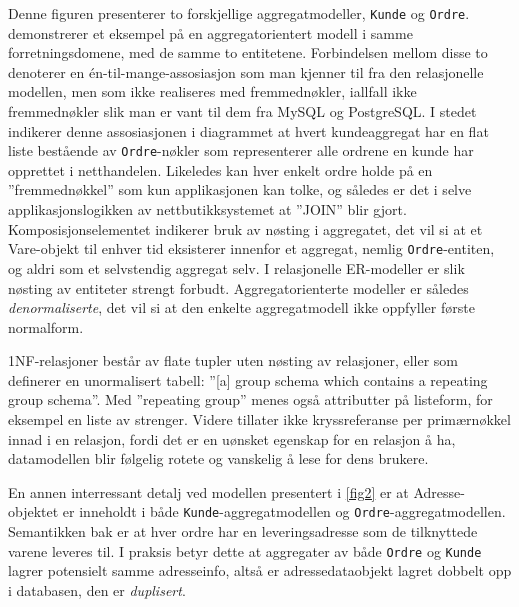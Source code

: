 Denne figuren presenterer to forskjellige aggregatmodeller, \texttt{Kunde} og \texttt{Ordre}. \cite{sadalage2013} demonstrerer et eksempel på en aggregatorientert modell i samme forretningsdomene, med de samme to entitetene. Forbindelsen mellom disse to denoterer en én-til-mange-assosiasjon som man kjenner til fra den relasjonelle modellen, men som ikke realiseres med fremmednøkler, iallfall ikke fremmednøkler slik man er vant til dem fra MySQL og PostgreSQL. I stedet indikerer denne assosiasjonen i diagrammet at hvert kundeaggregat har en flat liste bestående av \texttt{Ordre}-nøkler som representerer alle ordrene en kunde har opprettet i netthandelen. Likeledes kan hver enkelt ordre holde på en ''fremmednøkkel'' som kun applikasjonen kan tolke, og således er det i selve applikasjonslogikken av nettbutikksystemet at ''JOIN'' blir gjort. Komposisjonselementet indikerer bruk av nøsting i aggregatet, det vil si at et Vare-objekt til enhver tid eksisterer innenfor et aggregat, nemlig \texttt{Ordre}-entiten, og aldri som et selvstendig aggregat selv. I relasjonelle ER-modeller er slik nøsting av entiteter strengt forbudt. Aggregatorienterte modeller er således \emph{denormaliserte}, det vil si at den enkelte aggregatmodell ikke oppfyller første normalform.

1NF-relasjoner består av flate tupler uten nøsting av relasjoner, eller som \cite{codd1971} definerer en unormalisert tabell: ''[a] group schema which contains a repeating group schema''. Med ''repeating group'' menes også attributter på listeform, for eksempel en liste av strenger. Videre tillater ikke \cite{codd1971} kryssreferanse per primærnøkkel innad i en relasjon, fordi det er en uønsket egenskap for en relasjon å ha, datamodellen blir følgelig rotete og vanskelig å lese for dens brukere.

En annen interressant detalj ved modellen presentert i \ref{fig2} er at Adresse-objektet er inneholdt i både \texttt{Kunde}-aggregatmodellen og \texttt{Ordre}-aggregatmodellen. Semantikken bak er at hver ordre har en leveringsadresse som de tilknyttede varene leveres til. I praksis betyr dette at aggregater av både \texttt{Ordre} og \texttt{Kunde} lagrer potensielt samme adresseinfo, altså er adressedataobjekt lagret dobbelt opp i databasen, den er \emph{duplisert}.

